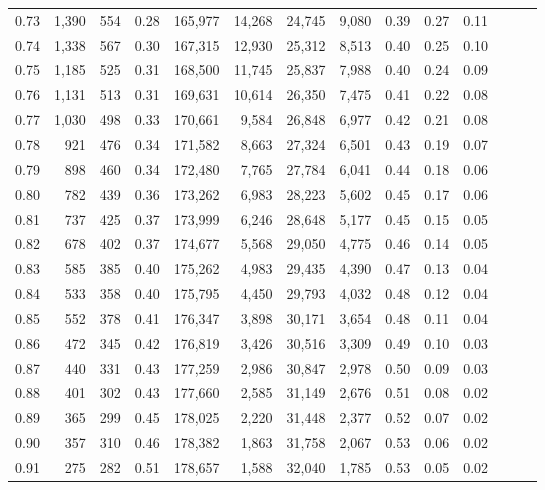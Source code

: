 \begin{tabular}{rrrrrrrrrrrrrr}
0.73 &  1,390 &  554 &  0.28 &  165,977 &   14,268 &  24,745 &   9,080 &  0.39 &  0.27 &      0.11 \\
0.74 &  1,338 &  567 &  0.30 &  167,315 &   12,930 &  25,312 &   8,513 &  0.40 &  0.25 &      0.10 \\
0.75 &  1,185 &  525 &  0.31 &  168,500 &   11,745 &  25,837 &   7,988 &  0.40 &  0.24 &      0.09 \\
0.76 &  1,131 &  513 &  0.31 &  169,631 &   10,614 &  26,350 &   7,475 &  0.41 &  0.22 &      0.08 \\
0.77 &  1,030 &  498 &  0.33 &  170,661 &    9,584 &  26,848 &   6,977 &  0.42 &  0.21 &      0.08 \\
0.78 &    921 &  476 &  0.34 &  171,582 &    8,663 &  27,324 &   6,501 &  0.43 &  0.19 &      0.07 \\
0.79 &    898 &  460 &  0.34 &  172,480 &    7,765 &  27,784 &   6,041 &  0.44 &  0.18 &      0.06 \\
0.80 &    782 &  439 &  0.36 &  173,262 &    6,983 &  28,223 &   5,602 &  0.45 &  0.17 &      0.06 \\
0.81 &    737 &  425 &  0.37 &  173,999 &    6,246 &  28,648 &   5,177 &  0.45 &  0.15 &      0.05 \\
0.82 &    678 &  402 &  0.37 &  174,677 &    5,568 &  29,050 &   4,775 &  0.46 &  0.14 &      0.05 \\
0.83 &    585 &  385 &  0.40 &  175,262 &    4,983 &  29,435 &   4,390 &  0.47 &  0.13 &      0.04 \\
0.84 &    533 &  358 &  0.40 &  175,795 &    4,450 &  29,793 &   4,032 &  0.48 &  0.12 &      0.04 \\
0.85 &    552 &  378 &  0.41 &  176,347 &    3,898 &  30,171 &   3,654 &  0.48 &  0.11 &      0.04 \\
0.86 &    472 &  345 &  0.42 &  176,819 &    3,426 &  30,516 &   3,309 &  0.49 &  0.10 &      0.03 \\
0.87 &    440 &  331 &  0.43 &  177,259 &    2,986 &  30,847 &   2,978 &  0.50 &  0.09 &      0.03 \\
0.88 &    401 &  302 &  0.43 &  177,660 &    2,585 &  31,149 &   2,676 &  0.51 &  0.08 &      0.02 \\
0.89 &    365 &  299 &  0.45 &  178,025 &    2,220 &  31,448 &   2,377 &  0.52 &  0.07 &      0.02 \\
0.90 &    357 &  310 &  0.46 &  178,382 &    1,863 &  31,758 &   2,067 &  0.53 &  0.06 &      0.02 \\
0.91 &    275 &  282 &  0.51 &  178,657 &    1,588 &  32,040 &   1,785 &  0.53 &  0.05 &      0.02 \\

\end{tabular}
